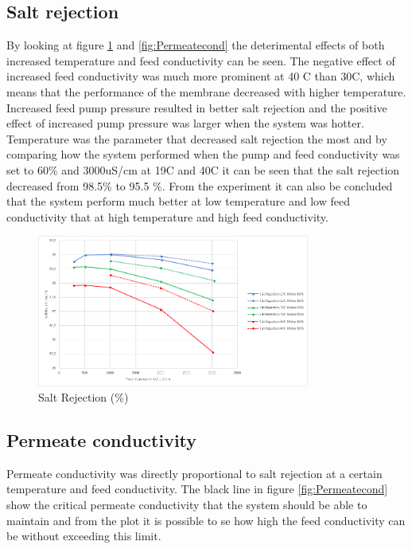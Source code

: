 \subsection{Salt rejection}

By looking at figure \ref{fig:SaltRejectionResult} and \ref{fig:Permeatecond} the deterimental effects of both increased temperature and feed conductivity can be seen. The negative effect of increased feed conductivity was much more prominent at 40 C than 30C, which means that the performance of the membrane decreased with higher temperature. Increased feed pump pressure resulted in better salt rejection and the positive effect of increased pump pressure was larger when the system was hotter. Temperature was the parameter that decreased salt rejection the most and by comparing how the system performed when the pump and feed conductivity was set to 60\% and 3000uS/cm at 19C and 40C it can be seen that the salt rejection decreased from 98.5\% to 95.5 \%. From the experiment it can also be concluded that the system perform much better at low temperature and low feed conductivity that at high temperature and high feed conductivity. 

\begin{figure}[H]
    \centering
    \includegraphics[width=0.8\textwidth]{SaltRejection}
    \caption{Salt Rejection (\%)}
    \label{fig:SaltRejectionResult}
\end{figure}
 
\subsection{Permeate conductivity}

Permeate conductivity was directly proportional to salt rejection at a certain temperature and feed conductivity. The black line in figure \ref{fig:Permeatecond} show the critical permeate conductivity that the system should be able to maintain and from the plot it is possible to se how high the feed conductivity can be without exceeding this limit.

